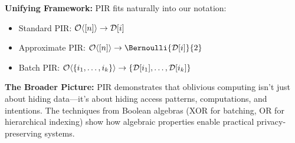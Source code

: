 \documentclass[11pt,final,hidelinks]{article}
\newcommand{\DB}{\mathcal{D}}
\begin{document}
\textbf{Unifying Framework:}
PIR fits naturally into our notation:
\begin{itemize}
    \item Standard PIR: $\Obv{[n]} \to \DB[i]$
    \item Approximate PIR: $\Obv{[n]} \to \Bernoulli{\DB[i]}{2}$
    \item Batch PIR: $\Obv{\{i_1, \ldots, i_k\}} \to \{\DB[i_1], \ldots, \DB[i_k]\}$
\end{itemize}

\textbf{The Broader Picture:}
PIR demonstrates that oblivious computing isn't just about hiding data—it's about hiding access patterns, computations, and intentions. The techniques from Boolean algebras (XOR for batching, OR for hierarchical indexing) show how algebraic properties enable practical privacy-preserving systems.


\end{document}

